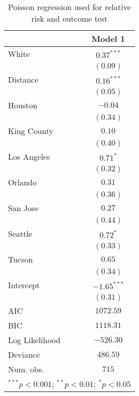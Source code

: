 
\begin{table}[ht!]
\begin{center}
\begin{tabular}{l c}
\toprule
 & Model 1 \\
\midrule
White          & $0.37^{***}$  \\
               & $(0.09)$      \\
Distance       & $0.16^{***}$  \\
               & $(0.05)$      \\
Houston        & $-0.04$       \\
               & $(0.34)$      \\
King County    & $0.10$        \\
               & $(0.40)$      \\
Los Angeles    & $0.71^{*}$    \\
               & $(0.32)$      \\
Orlando        & $0.31$        \\
               & $(0.36)$      \\
San Jose       & $0.27$        \\
               & $(0.44)$      \\
Seattle        & $0.72^{*}$    \\
               & $(0.33)$      \\
Tucson         & $0.65$        \\
               & $(0.34)$      \\
Intercept      & $-1.65^{***}$ \\
               & $(0.31)$      \\
\midrule
AIC            & $1072.59$     \\
BIC            & $1118.31$     \\
Log Likelihood & $-526.30$     \\
Deviance       & $486.59$      \\
Num. obs.      & $715$         \\
\bottomrule
\multicolumn{2}{l}{\scriptsize{$^{***}p<0.001$; $^{**}p<0.01$; $^{*}p<0.05$}}
\end{tabular}
\caption{Poisson regression used for relative risk and outcome test}
\label{tab:poissonRR2}
\end{center}
\end{table}
